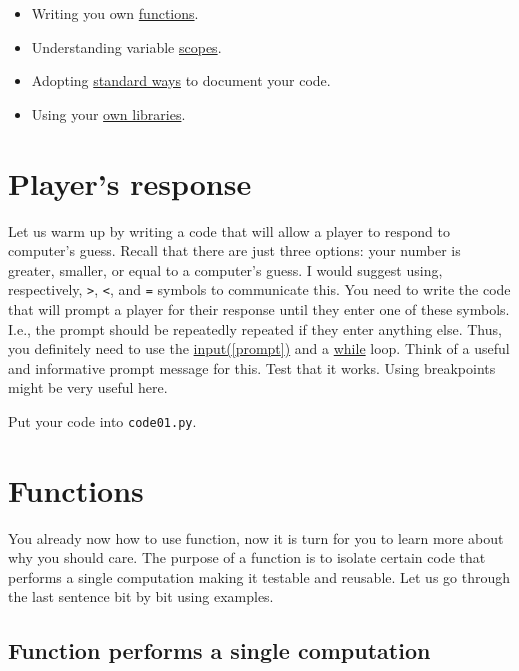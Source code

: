 \documentclass[
]{book}
\providecommand{\tightlist}{%
  \setlength{\itemsep}{0pt}\setlength{\parskip}{0pt}}
\begin{document}
\begin{itemize}
\tightlist
\item
  Writing you own \protect\hyperlink{function}{functions}.
\item
  Understanding variable \protect\hyperlink{scopes-for-immutable-values}{scopes}.
\item
  Adopting \protect\hyperlink{numpy-docstring}{standard ways} to document your code.
\item
  Using your \protect\hyperlink{using-you-own-libraries}{own libraries}.
\end{itemize}

\hypertarget{guess-the-number-players-response}{%
\section{Player's response}\label{guess-the-number-players-response}}

Let us warm up by writing a code that will allow a player to respond to computer's guess. Recall that there are just three options: your number is greater, smaller, or equal to a computer's guess. I would suggest using, respectively, \texttt{\textgreater{}}, \texttt{\textless{}}, and \texttt{=} symbols to communicate this. You need to write the code that will prompt a player for their response until they enter one of these symbols. I.e., the prompt should be repeatedly repeated if they enter anything else. Thus, you definitely need to use the \href{https://docs.python.org/3/library/functions.html\#input}{input({[}prompt{]})} and a \protect\hyperlink{while-loop}{while} loop. Think of a useful and informative prompt message for this. Test that it works. Using breakpoints might be very useful here.

Put your code into \texttt{code01.py}.

\hypertarget{function}{%
\section{Functions}\label{function}}

You already now how to use function, now it is turn for you to learn more about why you should care. The purpose of a function is to isolate certain code that performs a single computation making it testable and reusable. Let us go through the last sentence bit by bit using examples.

\hypertarget{function-performs-a-single-computation}{%
\subsection{Function performs a single computation}\label{function-performs-a-single-computation}}
\end{document}
